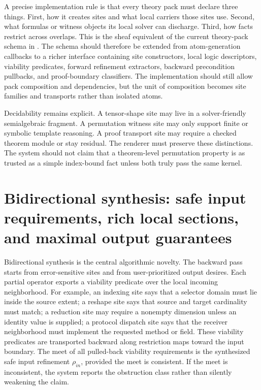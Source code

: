 \documentclass[11pt]{report}
\DeclareRobustCommand{\py}[1]{\texttt{\detokenize{#1}}}
\theoremstyle{definition}
\theoremstyle{plain}
\begin{document}
A precise implementation rule is that every theory pack must declare three
things. First, how it creates sites and what local carriers those sites use.
Second, what formulas or witness objects its local solver can discharge.
Third, how facts restrict across overlaps. This is the sheaf equivalent of the
current theory-pack schema in \py{src/deppy/core/theory_pack.py}. The
schema should therefore be extended from atom-generation callbacks to a richer
interface containing site constructors, local logic descriptors, viability
predicates, forward refinement extractors, backward precondition pullbacks, and
proof-boundary classifiers. The implementation should still allow pack
composition and dependencies, but the unit of composition becomes site families
and transports rather than isolated atoms.

Decidability remains explicit. A tensor-shape site may live in a solver-friendly
semialgebraic fragment. A permutation witness site may only support finite or
symbolic template reasoning. A proof transport site may require a checked theorem
module or stay residual. The renderer must preserve these distinctions. The
system should not claim that a theorem-level permutation property is as trusted
as a simple index-bound fact unless both truly pass the same kernel.


\section{Bidirectional synthesis: safe input requirements, rich local sections, and maximal output guarantees}

Bidirectional synthesis is the central algorithmic novelty. The backward pass
starts from error-sensitive sites and from user-prioritized output desires. Each
partial operator exports a viability predicate over the local incoming
neighborhood. For example, an indexing site says that a selector domain must lie
inside the source extent; a reshape site says that source and target cardinality
must match; a reduction site may require a nonempty dimension unless an identity
value is supplied; a protocol dispatch site says that the receiver neighborhood
must implement the requested method or field. These viability predicates are
transported backward along restriction maps toward the input boundary. The meet
of all pulled-back viability requirements is the synthesized safe input
refinement $\rho_{in}$, provided the meet is consistent. If the meet is
inconsistent, the system reports the obstruction class rather than silently
weakening the claim.
\end{document}
